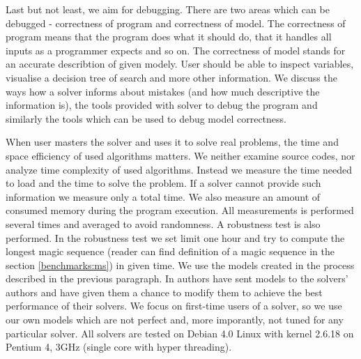Last but not least, we aim for debugging. There are two areas which can be 
debugged - correctness of program and correctness of model. The correctness of 
program means that the program does what it should do, that it handles all inputs as a programmer expects and so on. 
The correctness of model stands for an accurate describtion of given modely. User should be able to 
inspect variables, visualise a decision tree of search and more other information. 
We discuss the ways how a solver informs about mistakes (and how much descriptive the 
information is), the tools provided with solver to debug the program and similarly the 
tools which can be used to debug model correctness.

When user masters the solver and uses it to solve real problems, the time and space 
efficiency of used algorithms matters. We neither examine source codes, nor analyze 
time complexity of used algorithms. Instead we measure the time needed to 
load and the time to solve the problem. If a solver cannot provide such information 
we measure only a total time. We also measure an amount of consumed memory 
during the program execution. All measurements is performed several times 
and averaged to avoid randomness. A robustness test is also performed. 
In the robustness test we set limit one hour and try to compute the longest magic 
sequence (reader can find definition of a magic sequence in the section \ref{benchmarks:ms}) 
in given time. We use the models created in the process described in the previous 
paragraph. In \cite{fernandez00} authors have sent models to the solvers' authors and 
have given them a chance to modify them to achieve the best performance of their solvers. 
We focus on first-time users of a solver, so we use our own models which are 
not perfect and, more imporantly, not tuned for any particular solver. All solvers 
are tested on Debian 4.0 Linux with kernel 2.6.18 on Pentium 4, 3GHz (single core 
with hyper threading).